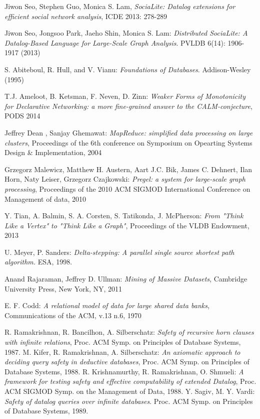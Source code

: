 \documentclass{pracamgr}
\theoremstyle{plain}
\theoremstyle{definition}
\theoremstyle{remark}
\begin{document}
\begin{thebibliography}{99}


 Jiwon Seo, Stephen Guo, Monica S. Lam, \textit{SociaLite: Datalog extensions for efficient social network analysis}, ICDE 2013: 278-289

 Jiwon Seo, Jongsoo Park, Jaeho Shin, Monica S. Lam: \textit{Distributed SociaLite: A Datalog-Based Language for Large-Scale Graph Analysis}. PVLDB 6(14): 1906-1917 (2013)

 S. Abiteboul, R. Hull, and V. Vianu: \textit{Foundations of Databases}. Addison-Wesley (1995)

 T.J. Ameloot, B. Ketsman, F. Neven, D. Zinn: \textit{Weaker Forms of Monotonicity for Declarative Networking: a more fine-grained answer to the CALM-conjecture}, PODS 2014

 Jeffrey Dean , Sanjay Ghemawat: \textit{MapReduce: simplified data processing on large clusters}, Proceedings of the 6th conference on Symposium on Opearting Systems Design \& Implementation, 2004

 Grzegorz Malewicz, Matthew H. Austern, Aart J.C. Bik, James C. Dehnert, Ilan Horn, Naty Leiser, Grzegorz Czajkowski: \textit{Pregel: a system for large-scale graph processing}, Proceedings of the 2010 ACM SIGMOD International Conference on Management of data, 2010

 Y. Tian, A. Balmin, S. A. Corsten, S. Tatikonda, J. McPherson: \textit{From "Think Like a Vertex" to "Think Like a Graph"}, Proceedings of the VLDB Endowment, 2013

 U. Meyer, P. Sanders: \textit{Delta-stepping: A parallel
single source shortest path algorithm.} ESA, 1998.

 Anand Rajaraman, Jeffrey D. Ullman: \textit{Mining of Massive Datasets}, Cambridge University Press, New York, NY, 2011

 E. F. Codd: \textit{A relational model of data for large shared data banks}, Communications of the ACM, v.13 n.6, 1970

 R. Ramakrishnan, R. Bancilhon, A. Silberschatz:  \textit{Safety of recursive horn clauses with infinite relations}, Proc. ACM Symp. on Principles of Database Systems, 1987.
 M. Kifer, R. Ramakrishnan, A. Silberschatz:  \textit{An axiomatic approach to deciding query safety in deductive databases}, Proc. ACM Symp. on Principles of Database Systems, 1988.
 R. Krishnamurthy, R. Ramakrishnan, O. Shmueli:  \textit{A framework for testing safety and effective computability of extended Datalog}, Proc. ACM SIGMOD Symp. on the Management of Data, 1988.
 Y. Sagiv, M. Y. Vardi:  \textit{Safety of datalog queries over infinite databases}.  Proc. ACM Symp. on Principles of Database Systems, 1989.


\end{thebibliography}
\end{document}
